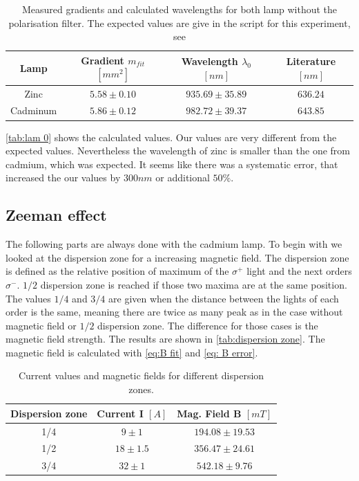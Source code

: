 \documentclass[]{article}
\begin{document}
\begin{table}[H]
\centering
\begin{tabular}{c|c|c|c}
Lamp & Gradient $m_{fit}$ $[mm^2]$ & Wavelength $\lambda_0$ $[nm]$ & Literature $[nm]$ \\ \hline\hline
Zinc & $5.58 \pm 0.10$  & $935.69 \pm 35.89$ & $636.24$ \\ \hline
Cadminum & $5.86 \pm 0.12$  & $982.72 \pm 39.37$ & $643.85$
\end{tabular}
\caption{Measured gradients and calculated wavelengths for both lamp without the polarisation filter. The expected values are give in the script for this experiment, see \cite{wiki}}
\label{tab:lam 0}
\end{table}

\autoref{tab:lam 0} shows the calculated values. Our values are very different from the expected values. Nevertheless the wavelength of zinc is smaller than the one from cadmium, which was expected. It seems like there was a systematic error, that increased the our values by $300nm$ or additional $50\%$.


\subsection{Zeeman effect}
The following parts are always done with the cadmium lamp. To begin with we looked at the dispersion zone for a increasing magnetic field. The dispersion zone is defined as the relative position of maximum of the $\sigma^+$ light and the next orders $\sigma^-$. $1/2$ dispersion zone is reached if those two maxima are at the same position. The values $1/4$ and $3/4$ are given when the distance between the lights of each order is the same, meaning there are twice as many peak as in the case without magnetic field or $1/2$ dispersion zone. The difference for those cases is the magnetic field strength. The results are shown in \autoref{tab:dispersion zone}. The magnetic field is calculated with \autoref{eq:B fit} and \autoref{eq: B error}.

\begin{table}[H]
\centering
\begin{tabular}{c|c|c}
Dispersion zone & Current I $[A]$ & Mag. Field B $[mT]$ \\ \hline\hline
1/4 & $9 \pm 1$  & $194.08 \pm 19.53$  \\ \hline
1/2 & $18 \pm 1.5$  & $356.47 \pm 24.61$  \\ \hline
3/4 & $32 \pm 1$  & $542.18 \pm 9.76$ 
\end{tabular}
\caption{ Current values and magnetic fields for different dispersion zones. }
\label{tab:dispersion zone}
\end{table}
\end{document}
